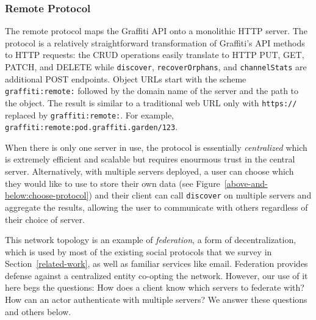 
\subsubsection{Remote Protocol}
\label{above-and-below:remote-protocol}

The remote protocol maps the Graffiti API onto
a monolithic HTTP server.
The protocol is a relatively straightforward transformation of
Graffiti's API methods to HTTP requests: the CRUD operations
easily translate to HTTP PUT, GET, PATCH, and DELETE while
\texttt{discover}, \texttt{recoverOrphans}, and \texttt{channelStats}
are additional POST endpoints.
Object URLs start with the scheme \texttt{graffiti:remote:}
followed by the domain name of the server and the
path to the object. The result is similar to a traditional
web URL only with \texttt{https://} replaced by \texttt{graffiti:remote:}.
For example, \texttt{graffiti:remote:pod.graffiti.garden/123}.

When there is only one server in use, the protocol is essentially
\emph{centralized} which is extremely efficient and scalable but requires
enourmous trust in the central server.
Alternatively, with multiple servers deployed,
a user can choose which they would like to use to store their own data
(see Figure~\ref{above-and-below:choose-protocol})
and their client can call \texttt{discover} on
multiple servers and aggregate the results,
allowing the user to communicate with others regardless
of their choice of server.

This network topology is an example of \emph{federation},
a form of decentralization, which is used by most of the
existing social protocols that we survey in Section~\ref{related-work},
as well as familiar services like email.
Federation provides defense against a centralized entity
co-opting the network.
However, our use of it here begs the questions:
How does a client know which servers to federate with?
How can an actor authenticate with multiple servers?
We answer these questions and others below.


